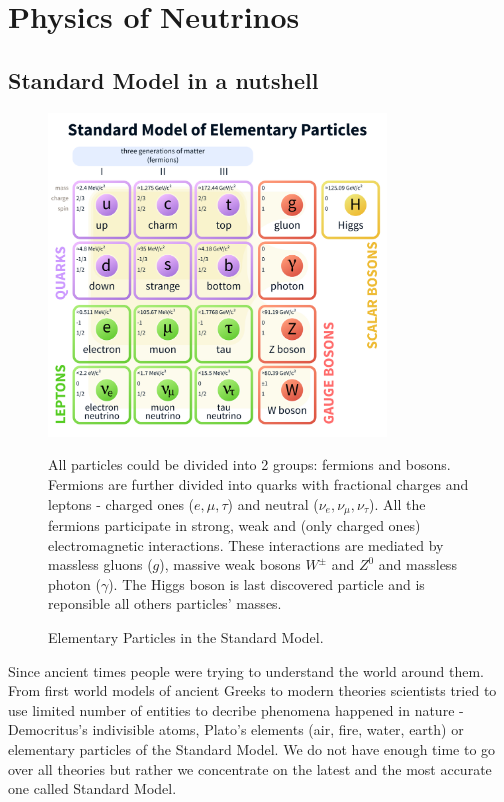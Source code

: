 \chapter{Physics of Neutrinos}
\label{neutrino_physics_chapter}

\section{Standard Model in a nutshell}
\begin{figure}
\includegraphics[width=0.8\textwidth]{figures/Standard_Model_of_Elementary_Particles.png}
\centering
\caption{Elementary Particles in the Standard Model.} 
All particles could be divided into 2 groups: fermions and bosons. Fermions are 
further divided into quarks with fractional charges and leptons - charged ones ($e, \mu, \tau$)
and neutral ($\nu_e, \nu_\mu, \nu_{\tau}$). All the fermions participate in strong, 
weak and (only charged ones) electromagnetic interactions. These interactions are 
mediated by massless gluons ($g$), massive weak bosons $W^{\pm}$ and $Z^0$ and massless
photon ($\gamma$). The Higgs boson is last discovered particle and is reponsible all others 
particles' masses.
\end{figure}
Since ancient times people were trying to understand the world around them. From 
first world models of ancient Greeks to modern theories scientists tried to use 
limited number of entities to decribe phenomena happened in nature - Democritus's 
indivisible atoms, Plato's elements (air, fire, water, earth) or elementary particles 
of the Standard Model. We do not have enough time to go over all theories but rather we 
concentrate on the latest and the most accurate one called Standard Model. 


